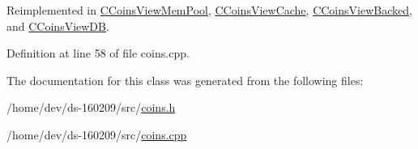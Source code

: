 Reimplemented in \hyperlink{class_c_coins_view_mem_pool_a965e6c8e378fe937620ba2c180d1ed74}{C\+Coins\+View\+Mem\+Pool}, \hyperlink{class_c_coins_view_cache_a25dddabe8734fc9823112763494da72b}{C\+Coins\+View\+Cache}, \hyperlink{class_c_coins_view_backed_a6a769cf9cc55128dea8e1a2798056e71}{C\+Coins\+View\+Backed}, and \hyperlink{class_c_coins_view_d_b_a4d08cf2d3440c1de4e48cfddd67962d7}{C\+Coins\+View\+D\+B}.



Definition at line 58 of file coins.\+cpp.



The documentation for this class was generated from the following files\+:\begin{DoxyCompactItemize}
\item 
/home/dev/ds-\/160209/src/\hyperlink{coins_8h}{coins.\+h}\item 
/home/dev/ds-\/160209/src/\hyperlink{coins_8cpp}{coins.\+cpp}\end{DoxyCompactItemize}
